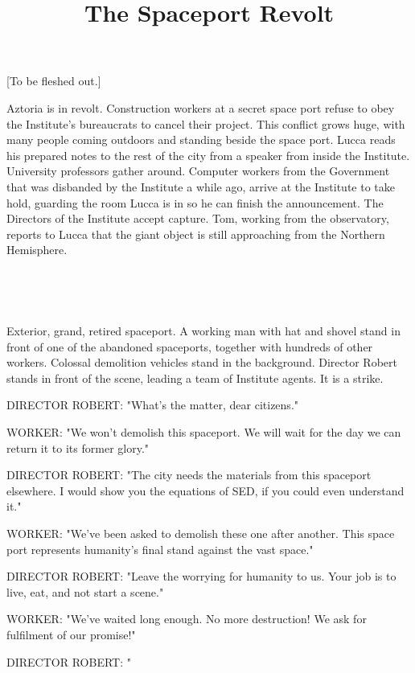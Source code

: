 \documentclass[11pt]{article}
\begin{document}
\ttfamily
\title{The Spaceport Revolt}
\maketitle



[To be fleshed out.]

Aztoria is in revolt. 
Construction workers at a secret space port refuse to obey the Institute's bureaucrats to cancel their project.
This conflict grows huge, with many people coming outdoors and standing beside the space port.
Lucca reads his prepared notes to the rest of the city from a speaker from inside the Institute.
University professors gather around.
Computer workers from the Government that was disbanded by the Institute a while ago, arrive at the Institute to take hold, guarding the room Lucca is in so he can finish the announcement.
The Directors of the Institute accept capture.
Tom, working from the observatory, reports to Lucca that the giant object is still approaching from the Northern Hemisphere. 

\ 

\ 

Exterior, grand, retired spaceport.
A working man with hat and shovel stand in front of one of the abandoned spaceports, together with hundreds of other workers. 
Colossal demolition vehicles stand in the background.
Director Robert stands in front of the scene, leading a team of Institute agents. 
It is a strike.

DIRECTOR ROBERT: "What's the matter, dear citizens."

WORKER: "We won't demolish this spaceport.
We will wait for the day we can return it to its former glory."

DIRECTOR ROBERT: "The city needs the materials from this spaceport elsewhere. 
I would show you the equations of SED, if you could even understand it."

WORKER: "We've been asked to demolish these one after another. 
This space port represents humanity's final stand against the vast space."

DIRECTOR ROBERT: "Leave the worrying for humanity to us. 
Your job is to live, eat, and not start a scene."

WORKER: "We've waited long enough.
No more destruction! 
We ask for fulfilment of our promise!"

DIRECTOR ROBERT: "
\end{document}
